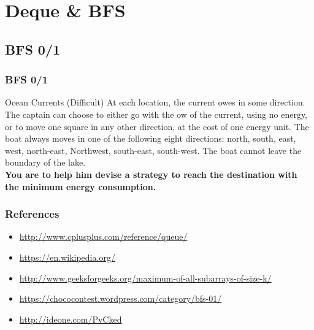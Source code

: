 \documentclass{beamer}
\begin{document}

\section{ Deque \& BFS}
\subsection{BFS 0/1}
\begin{frame}
\frametitle{BFS 0/1}

\begin{block}{Ocean Currents (Difficult)}
At each location, the current  owes in some direction. The captain can choose to either go with the
 ow of the current, using no energy, or to move one square in any other direction, at the cost of one
energy unit. The boat always moves in one of the following eight directions: north, south, east, west,
north-east, Northwest, south-east, south-west. The boat cannot leave the boundary of the lake.\\

\textbf{You are to help him devise a strategy to reach the destination with the minimum energy consumption.}
\end{block}

\end{frame}
\begin{frame}
\frametitle{ References }
\begin{itemize}
	\item \url{http://www.cplusplus.com/reference/queue/}
	\item \url{https://en.wikipedia.org/}
	\item \url{http://www.geeksforgeeks.org/maximum-of-all-subarrays-of-size-k/}
	\item \url{https://chococontest.wordpress.com/category/bfs-01/}
	\item \url{http://ideone.com/PvCked}
\end{itemize}
\end{frame}
\end{document}
